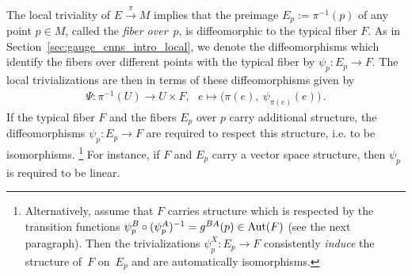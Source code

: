 The local triviality of $E\!\xrightarrow{\pi}\!M$ implies that the preimage $E_p:=\pi^{-1}(p)$ of any point $p\in M$, called the \emph{fiber over}~$p$, is diffeomorphic to the typical fiber $F$.
As in Section~\ref{sec:gauge_cnns_intro_local}, we denote the diffeomorphisms which identify the fibers over different points with the typical fiber by $\psi_p:E_p\to F$.
The local trivializations are then in terms of these diffeomorphisms given by
\begin{align}\label{eq:Psi_via_psi}
    \Psi:\pi^{-1}(U)\to U\times F,\ \ \ e\mapsto \big(\pi(e),\: \psi_{\pi(e)}(e)\big) \,.
\end{align}
If the typical fiber $F$ and the fibers $E_p$ over $p$ carry additional structure, the diffeomorphisms $\psi_p: E_p\to F$ are required to respect this structure, i.e. to be isomorphisms.%
\footnote{
    Alternatively, assume that $F$ carries structure which is respected by the transition functions $\psi_p^B \circ (\psi_p^A)^{-1} = g^{BA}(p) \in \operatorname{Aut}(F)$ (see the next paragraph).
    Then the trivializations $\psi_p^X: E_p \to F$ consistently \emph{induce} the structure of~$F$ on~$E_p$ and are automatically isomorphisms.
}
For instance, if $F$ and $E_p$ carry a vector space structure, then $\psi_p$ is required to be linear.


